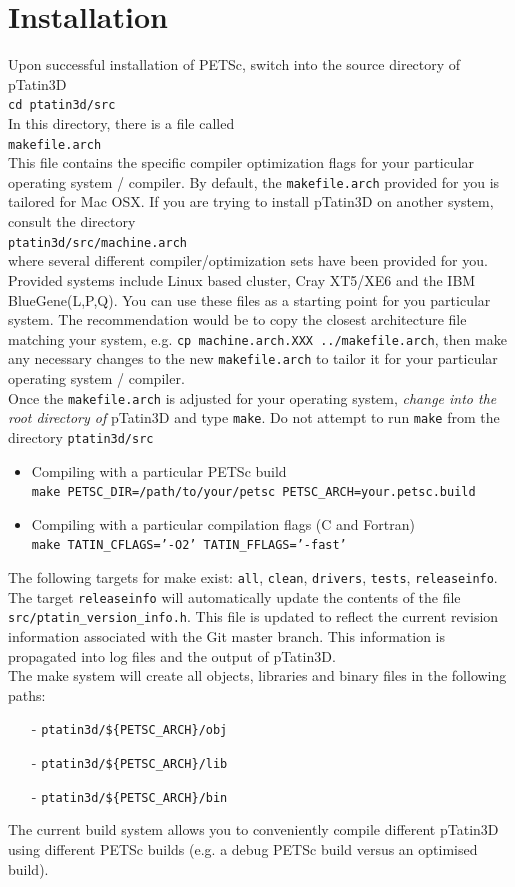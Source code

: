 \documentclass[paper=a4, fontsize=11pt,twoside]{scrartcl}
\newcommand{\ptat}{{{\sc pTatin3D}}}
\newcommand{\shellcmd}[1]{\\\indent\indent\texttt{\hspace{5mm}\footnotesize #1}\\}
\newcommand{\unix}[1]{\texttt{\footnotesize #1}}
\begin{document}
\section{Installation}
Upon successful installation of PETSc, switch into the source directory of {\ptat}
\shellcmd{cd ptatin3d/src}
In this directory, there is a file called
\shellcmd{makefile.arch}
This file contains the specific compiler optimization flags for your particular operating system / compiler.
By default, the \unix{makefile.arch} provided for you is tailored for Mac OSX. 
If you are trying to install {\ptat} on another system,
consult the directory
\shellcmd{ptatin3d/src/machine.arch}
where several different compiler/optimization sets have been provided for you. Provided systems include Linux based cluster, Cray XT5/XE6 and the  IBM BlueGene(L,P,Q). You can use these files as a starting point for you particular system. The recommendation would be to copy the closest architecture file matching your system, e.g. \unix{cp machine.arch.XXX  ../makefile.arch}, then make any necessary changes to the new \unix{makefile.arch} to tailor it for your particular operating system / compiler.
\\[8pt]
%
Once the \unix{makefile.arch} is adjusted for your operating system, \textit{change into the root directory of} {\ptat} and type \unix{make}.
Do not attempt to run \unix{make} from the directory \unix{ptatin3d/src}
\begin{itemize}
	\item Compiling with a particular PETSc build
	\shellcmd{make PETSC\_DIR=/path/to/your/petsc PETSC\_ARCH=your.petsc.build}
	\item Compiling with a particular compilation flags (C and Fortran)
	\shellcmd{make TATIN\_CFLAGS='-O2' TATIN\_FFLAGS='-fast'}
\end{itemize}
%
The following targets for make exist: \unix{all}, \unix{clean}, \unix{drivers}, \unix{tests}, \unix{releaseinfo}.
The target \unix{releaseinfo} will automatically update the contents of the file \unix{src/ptatin\_version\_info.h}.
This file is updated to reflect the current revision information associated with the Git master branch. This information is
propagated into log files and the output of {\ptat}.
\\[8pt]
%
The make system will create all objects, libraries and binary files in the following paths:
\begin{enumerate}
\setlength\itemsep{0mm}
	\item[-] \unix{ptatin3d/\$\{PETSC\_ARCH\}/obj}
	\item[-] \unix{ptatin3d/\$\{PETSC\_ARCH\}/lib}
	\item[-] \unix{ptatin3d/\$\{PETSC\_ARCH\}/bin}
\end{enumerate}
The current build system allows you to conveniently compile different {\ptat} using different PETSc builds (e.g. a debug PETSc build versus an optimised build).
\end{document}
